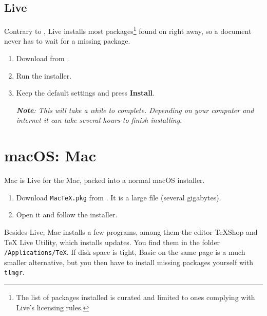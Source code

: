 \subsection{ Live}\label{sec:texlive-windows}

Contrary to ,  Live installs most packages\footnote{The list of packages installed is curated and limited to ones complying with  Live's licensing rules.} found on  right away,
so a document never has to wait for a missing package.

\begin{enumerate}
    \item Download  from .
    \item Run the installer.
    \item Keep the default settings and press \textbf{Install}.

        \textit{\textbf{Note}: This will take a while to complete.
            Depending on your computer and internet it can take several hours to finish installing.}
\end{enumerate}

\section{macOS: Mac}\label{sec:mactex}

Mac is  Live for the Mac, packed into a normal macOS installer.

\begin{enumerate}
    \item Download \texttt{MacTeX.pkg} from .
        It is a large file (several gigabytes).
    \item Open it and follow the installer.
\end{enumerate}

Besides  Live, Mac installs a few programs,
among them the editor TeXShop and TeX Live Utility, which installs updates.
You find them in the folder \texttt{/Applications/TeX}.
If disk space is tight, Basic on the same page is a much smaller alternative,
but you then have to install missing packages yourself with \texttt{tlmgr}.

